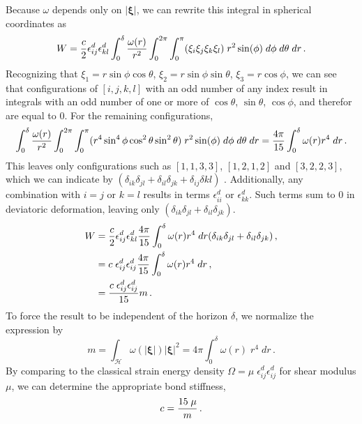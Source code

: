 %
Because $\omega$ depends only on $|\boldsymbol{\xi}|$, we can rewrite this integral in spherical coordinates as
%
\begin{equation}
W= \frac{c}{2}\epsilon_{ij}^d \epsilon_{kl}^d \int_0^\delta \frac{\omega(r)}{r^2}\int_0^{2\pi}\int_0^\pi (\xi_i\xi_j\xi_k\xi_l)\;r^2 \sin(\phi)\;d\phi\;d\theta\;dr\, .\notag
\end{equation}
%
Recognizing that $\xi_1 = r \sin\phi\cos\theta$, $\xi_2=r\sin\phi\sin\theta$, $\xi_3=r\cos\phi$, we can see that configurations of $[i,j,k,l]$ with an odd number of any index result in integrals with an odd number of one or more of $\cos\theta$, $\sin\theta$, $\cos\phi$, and therefor are equal to 0. 
For the remaining configurations,
%
\begin{equation}
\int_0^\delta \frac{\omega(r)}{r^2}\int_0^{2\pi}\int_0^\pi (r^4 \sin^4 \phi \cos^2\theta\sin^2\theta)\;r^2 \sin(\phi)\;d\phi\;d\theta\;dr =  \frac{4\pi}{15} \int_0^\delta \omega(r)r^4\;dr\, .\notag
\end{equation}
%
This leaves only configurations such as $[1,1,3,3]$, $[1,2,1,2]$ and $[3,2,2,3]$, which we can indicate by $(\delta_{ik}\delta_{jl}+\delta_{il}\delta_{jk}+\delta_{ij}\delta{kl})$ .
Additionally, any combination with $i=j$ or $k=l$ results in terms $\epsilon_{ii}^d$ or  $\epsilon_{kk}^d$.
Such terms sum to 0 in deviatoric deformation, leaving only $(\delta_{ik}\delta_{jl}+\delta_{il}\delta_{jk})$.
%
\begin{align}
W&= \frac{c}{2}\epsilon_{ij}^d \epsilon_{kl}^d \frac{4\pi}{15} \int_0^\delta \omega(r)r^4\;dr (\delta_{ik}\delta_{jl}+\delta_{il}\delta_{jk})\, ,\notag\\
&= c \;\epsilon_{ij}^d\epsilon_{ij}^d \frac{4\pi}{15} \int_0^\delta \omega(r)r^4\;dr\, , \notag\\
&= \frac{c\; \epsilon_{ij}^d\epsilon_{ij}^d }{15}m\, .\notag
\end{align}
%
To force the result to be independent of the horizon $\delta$, we normalize the expression by
%
\begin{equation}
\label{eq:weighted}
m=\int_\mathcal{H}\omega(|\boldsymbol{\xi}|)|\boldsymbol{\xi}|^2 = 4\pi \int_0^\delta \omega(r)\;r^4\;dr\, .
\end{equation}
%
By comparing to the classical strain energy density $\Omega = \mu\;\epsilon_{ij}^d\epsilon_{ij}^d$ for shear modulus $\mu$, we can determine the appropriate bond stiffness,
%
\begin{equation}
c = \frac{15\;\mu}{m}\, .\notag
\end{equation}
